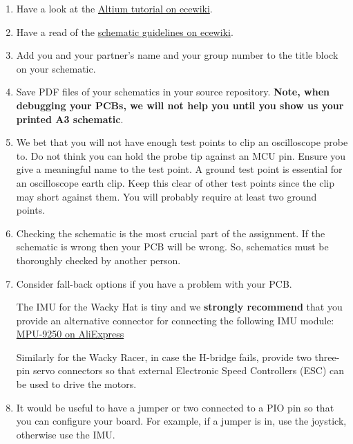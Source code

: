 \documentclass[11pt, a4paper]{article}
\begin{document}
\begin{enumerate}
\item Have a look at the
  \href{http://ecewiki.elec.canterbury.ac.nz/mediawiki/index.php/ENCE461_Altium_tutorial}{Altium
    tutorial on ecewiki}.

\item Have a read of the
  \href{http://ecewiki.elec.canterbury.ac.nz/mediawiki/index.php/Schematic_guidelines}{schematic
    guidelines on ecewiki}.

\item Add you and your partner's name and your group number to the
  title block on your schematic.

\item Save PDF files of your schematics in your source repository.
  \textbf{Note, when debugging your PCBs, we will not help you until
    you show us your printed A3 schematic}.

\item We bet that you will not have enough test points to clip an
  oscilloscope probe to.  Do not think you can hold the probe tip
  against an MCU pin.  Ensure you give a meaningful name to the test
  point.  A ground test point is essential for an oscilloscope earth
  clip. Keep this clear of other test points since the clip may short
  against them.  You will probably require at least two ground points.
  
\item Checking the schematic is the most crucial part of the
  assignment.  If the schematic is wrong then your PCB will be wrong.
  So, schematics must be thoroughly checked by another person.

\item Consider fall-back options if you have a problem with your PCB.

  The IMU for the Wacky Hat is tiny and we \textbf{strongly recommend} that you
  provide an alternative connector for connecting the following IMU module:
  \href{https://www.aliexpress.com/item/SPI-IIC-MPU9250-MPU-9250-MPU-9250-9-Axis-Attitude-Gyro-Accelerator-Magnetometer-Sensor-Module-MPU9250/32216818498.html?spm=a2g0s.9042311.0.0.WKvtEm}{MPU-9250 on AliExpress}

  Similarly for the Wacky Racer, in case the H-bridge fails, provide two
  three-pin servo connectors so that external Electronic Speed
  Controllers (ESC) can be used to drive the motors.

\item It would be useful to have a jumper or two connected to a PIO
  pin so that you can configure your board.  For example, if a jumper
  is in, use the joystick, otherwise use the IMU.
  
\end{enumerate}
\end{document}
